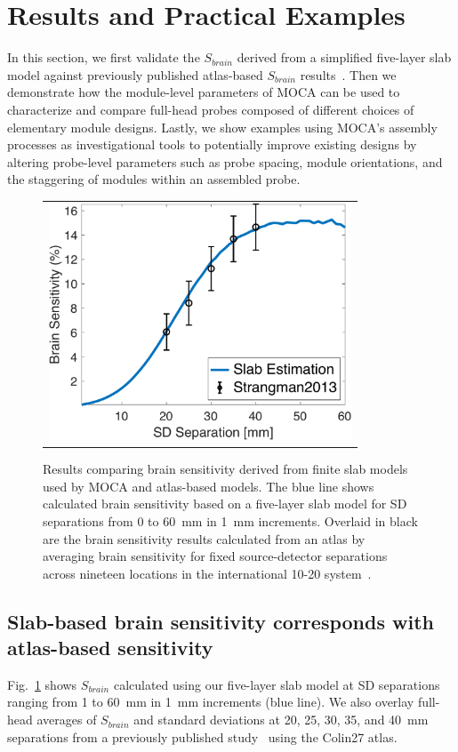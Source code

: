 \section{Results and Practical Examples}
\label{sec:results}
In this section, we first validate the $S_{brain}$ derived from a simplified five-layer slab model against previously published atlas-based $S_{brain}$ results~\cite{Strangman2013}. Then we demonstrate how the module-level parameters of \ac{MOCA} can be used to characterize and compare full-head probes composed of different choices of elementary module designs. Lastly, we show examples using \ac{MOCA}'s assembly processes as investigational tools to potentially improve existing designs by altering probe-level parameters such as probe spacing, module orientations, and the staggering of modules within an assembled probe.

\begin{figure}
    \begin{center}
    \begin{tabular}{c}
    \includegraphics[width=9cm]{fig/moca/Fig_3.pdf}
    \end{tabular}
    \end{center}
    \caption {Results comparing brain sensitivity derived from finite slab models used by MOCA and atlas-based models. The blue line shows calculated brain sensitivity based on a five-layer slab model for SD separations from 0 to 60~mm in 1~mm increments. Overlaid in black are the brain sensitivity results calculated from an atlas by averaging brain sensitivity for fixed source-detector separations across nineteen locations in the international 10-20 system~\cite{Strangman2013}. } 
    \label{fig:BScomparison}
\end{figure} 

\subsection{Slab-based brain sensitivity corresponds with atlas-based sensitivity}
Fig.~\ref{fig:BScomparison} shows $S_{brain}$ calculated using our five-layer slab model at \ac{SD} separations ranging from 1 to 60~mm in 1~mm increments (blue line). We also overlay full-head averages of $S_{brain}$ and standard deviations at 20, 25, 30, 35, and 40~mm separations from a previously published study~\cite{Strangman2013} using the Colin27 atlas.

